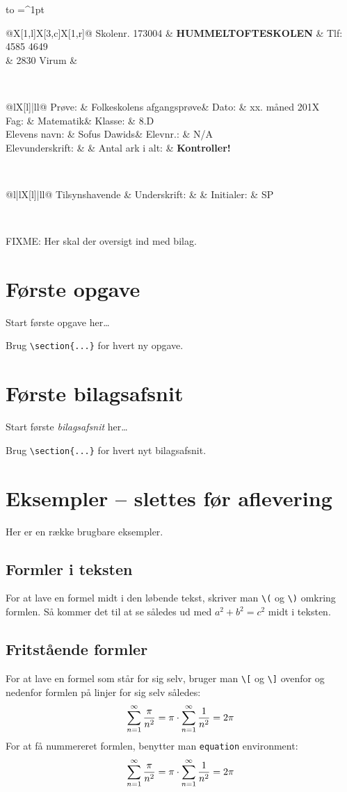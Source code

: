 \documentclass[a4,12pt]{article}
\makeatletter
\numberwithin{equation}{section}
\newcommand{\skoleklasse}{8.D} %
\newcommand{\proevetype}{Folkeskolens afgangsprøve}
\newcommand{\proevefag}{Matematik}
\newcommand{\elevnavn}{Sofus Dawids}
\newcommand{\elevnummer}{N/A} %
\newcommand{\tilsynshavende}{SP} %
\newcommand{\eksamensdato}{xx. måned 201X} %
\newcommand{\antalarkialt}{\pageref*{LastPage} \textbf{Kontroller!}} %
\newcommand{\eksamensforsideboks}{
\noindent
\begin{tabu} to  \textwidth {|X[c]|}
  \hline
  \tabulinesep=^1pt
  \begin{tabu} {@{}X[1,l]X[3,c]X[1,r]@{}}
    Skolenr. 173004 & {\large \textbf{HUMMELTOFTESKOLEN}} & Tlf: 4585 4649 \\
  & 2830 Virum & \\
  \end{tabu} \\
  \hline
  \begin{tabu} {@{}lX[l]|ll@{}}
    Prøve: & \proevetype & Dato: & \eksamensdato \\
    Fag: & \proevefag & Klasse: & \skoleklasse \\
    Elevens navn: & \elevnavn & Elevnr.: & \elevnummer \\
    Elevunderskrift: & & Antal ark i alt: & \antalarkialt \\[0.5cm]
  \end{tabu} \\
  \hline
  \begin{tabu} {@{}l|lX[l]|ll@{}}
    Tilsynshavende & Underskrift: & & Initialer: & \tilsynshavende \\[0.5cm]
  \end{tabu} \\
  \hline
\end{tabu}
\vspace{1cm}
}
\makeatother
\begin{document}
\thispagestyle{plain}
\eksamensforsideboks


FIXME: Her skal der oversigt ind med bilag.

\section{Første opgave}
Start første opgave her\ldots

Brug \verb$\section{...}$ for hvert ny opgave.

\appendix
\section{Første bilagsafsnit}
Start første \emph{bilagsafsnit} her\ldots

Brug \verb$\section{...}$ for hvert nyt bilagsafsnit.

\section{Eksempler -- slettes før aflevering}
Her er en række brugbare eksempler.

\subsection{Formler i teksten}
For at lave en formel midt i den løbende tekst, skriver man \verb$\($ og \verb$\)$ omkring formlen.
Så kommer det til at se således ud med \( a^2 + b^2 = c^2 \) midt i teksten.

\subsection{Fritstående formler}
For at lave en formel som står for sig selv, bruger man \verb$\[$ og \verb$\]$ ovenfor og nedenfor formlen på linjer for sig selv således:
\[
  \sum\limits_{n=1}^\infty{\pi \over n^2}
    = \pi \cdot \sum\limits_{n=1}^\infty{1 \over n^2}
    = 2\pi
\]
For at få nummereret formlen, benytter man \verb$equation$ environment:
\begin{equation}
  \sum\limits_{n=1}^\infty{\pi \over n^2}
    = \pi \cdot \sum\limits_{n=1}^\infty{1 \over n^2}
    = 2\pi
\end{equation}
\end{document}
